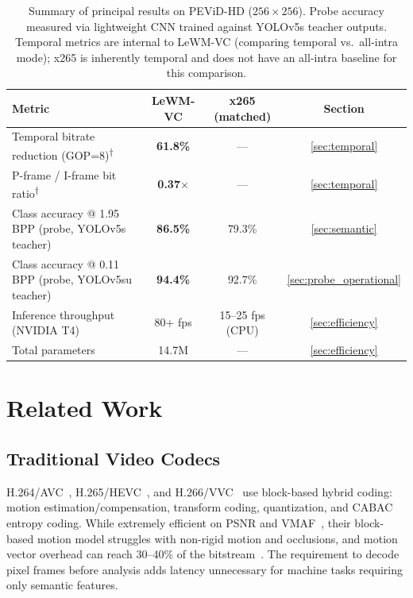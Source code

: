 \documentclass{article}
\begin{document}
\begin{table}[ht]
\centering
\caption{Summary of principal results on PEViD-HD ($256{\times}256$). Probe accuracy measured via lightweight CNN trained against YOLOv5s teacher outputs. Temporal metrics are internal to LeWM-VC (comparing temporal vs.\ all-intra mode); x265 is inherently temporal and does not have an all-intra baseline for this comparison.}
\label{tab:key_results}
\begin{tabular}{lccc}
\toprule
\textbf{Metric} & \textbf{LeWM-VC} & \textbf{x265 (matched)} & \textbf{Section} \\
\midrule
Temporal bitrate reduction (GOP=8)\textsuperscript{$\dagger$} & \textbf{61.8\%} & --- & \ref{sec:temporal} \\
P-frame / I-frame bit ratio\textsuperscript{$\dagger$}        & \textbf{0.37$\times$} & --- & \ref{sec:temporal} \\
Class accuracy @ 1.95 BPP (probe, YOLOv5s teacher)  & \textbf{86.5\%}   & 79.3\%                   & \ref{sec:semantic} \\
Class accuracy @ 0.11 BPP (probe, YOLOv5su teacher) & \textbf{94.4\%}   & 92.7\%                   & \ref{sec:probe_operational} \\
Inference throughput (NVIDIA T4)                     & 80+ fps           & 15--25 fps (CPU)         & \ref{sec:efficiency} \\
Total parameters                                     & 14.7M             & ---                      & \ref{sec:efficiency} \\
\bottomrule
\end{tabular}
\end{table}

\section{Related Work}
\label{sec:related}

\subsection{Traditional Video Codecs}
H.264/AVC~\cite{wiegand2003h264}, H.265/HEVC~\cite{sullivan2012overview}, and H.266/VVC~\cite{bross2021vvc} use block-based hybrid coding: motion estimation/compensation, transform coding, quantization, and CABAC entropy coding. While extremely efficient on PSNR and VMAF~\cite{li2016vmaf}, their block-based motion model struggles with non-rigid motion and occlusions, and motion vector overhead can reach 30--40\% of the bitstream~\cite{ma2019motion}. The requirement to decode pixel frames before analysis adds latency unnecessary for machine tasks requiring only semantic features.
\end{document}

